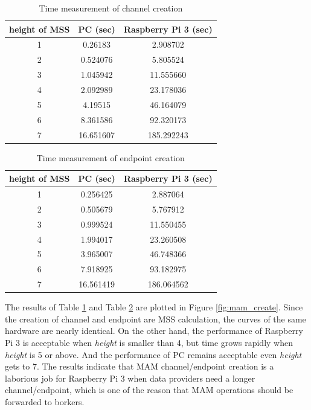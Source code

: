 \documentclass[journal,article,applsci,submit,moreauthors,pdftex]{Definitions/mdpi}
\begin{document}
\begin{table}[H]
	\caption{Time measurement of channel creation}
	\centering
	\label{tab:channel_create}
	\begin{tabular}{ccc}
	\toprule
		\textbf{height of MSS} & \textbf{PC (sec)} & \textbf{Raspberry Pi 3 (sec)} \\ 
		\midrule
		1 & 0.26183 & 2.908702 \\ 
		2 & 0.524076 & 5.805524 \\ 
		3 & 1.045942 & 11.555660 \\ 
		4 & 2.092989 & 23.178036 \\ 
		5 & 4.19515 & 46.164079\\ 
		6 & 8.361586 & 92.320173\\ 
		7 & 16.651607 & 185.292243\\
		\bottomrule
	\end{tabular}
\end{table}

\begin{table}[H]
	\caption{Time measurement of endpoint creation}
	\centering
	\label{tab:endpoint_create}
	\begin{tabular}{ccc}
	\toprule
		\textbf{height of MSS} & \textbf{PC (sec)} & \textbf{Raspberry Pi 3 (sec)} \\ 
		\midrule
		1 & 0.256425 & 2.887064 \\ 
		2 & 0.505679 & 5.767912 \\ 
		3 & 0.999524 & 11.550455 \\ 
		4 & 1.994017 & 23.260508 \\ 
		5 & 3.965007 & 46.748366 \\ 
		6 & 7.918925 & 93.182975 \\ 
		7 & 16.561419 & 186.064562 \\
		\bottomrule
	\end{tabular}
\end{table}

The results of Table \ref{tab:channel_create} and Table \ref{tab:endpoint_create} are plotted in Figure \ref{fig:mam_create}. Since the creation of channel and endpoint are MSS calculation, the curves of the same hardware are nearly identical. On the other hand, the performance of Raspberry Pi 3 is acceptable when \textit{height} is smaller than 4, but time grows rapidly when \textit{height} is 5 or above. And the performance of PC remains acceptable even \textit{height} gets to 7. The results indicate that MAM channel/endpoint creation is a laborious job for Raspberry Pi 3 when data providers need a longer channel/endpoint, which is one of the reason that MAM operations should be forwarded to borkers.
  
\end{document}
